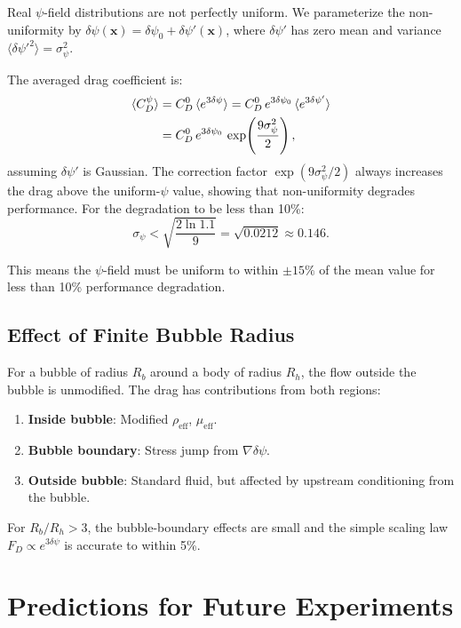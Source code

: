 \documentclass[12pt,twocolumn]{article}
\newcommand{\Reff}{\mathrm{eff}}
\newcommand{\xvec}{\mathbf{x}}
\newcommand{\dpsi}{\delta\psi}
\begin{document}
Real $\psi$-field distributions are not perfectly uniform. We parameterize
the non-uniformity by $\dpsi(\xvec) = \dpsi_0 + \dpsi'(\xvec)$, where
$\dpsi'$ has zero mean and variance $\langle\dpsi'^2\rangle = \sigma_\psi^2$.

The averaged drag coefficient is:
\begin{align}
\langle C_D^\psi \rangle &= C_D^0\,\langle e^{3\dpsi}\rangle
= C_D^0\,e^{3\dpsi_0}\,\langle e^{3\dpsi'}\rangle \notag\\
&= C_D^0\,e^{3\dpsi_0}\,\exp\!\left(\frac{9\sigma_\psi^2}{2}\right),
\end{align}
assuming $\dpsi'$ is Gaussian. The correction factor
$\exp(9\sigma_\psi^2/2)$ always increases the drag above the uniform-$\psi$
value, showing that non-uniformity degrades performance. For the degradation
to be less than 10\%:
\begin{equation}
\sigma_\psi < \sqrt{\frac{2\ln 1.1}{9}} = \sqrt{0.0212} \approx 0.146.
\end{equation}

This means the $\psi$-field must be uniform to within $\pm 15\%$ of the
mean value for less than 10\% performance degradation.

\subsection{Effect of Finite Bubble Radius}

For a bubble of radius $R_b$ around a body of radius $R_h$, the flow
outside the bubble is unmodified. The drag has contributions from both
regions:
\begin{enumerate}[noitemsep]
\item \textbf{Inside bubble}: Modified $\rho_\Reff$, $\mu_\Reff$.
\item \textbf{Bubble boundary}: Stress jump from $\nabla\dpsi$.
\item \textbf{Outside bubble}: Standard fluid, but affected by upstream
  conditioning from the bubble.
\end{enumerate}

For $R_b/R_h > 3$, the bubble-boundary effects are small and the simple
scaling law $F_D \propto e^{3\dpsi}$ is accurate to within 5\%.

\section{Predictions for Future Experiments}
\label{sec:predictions}
\end{document}
